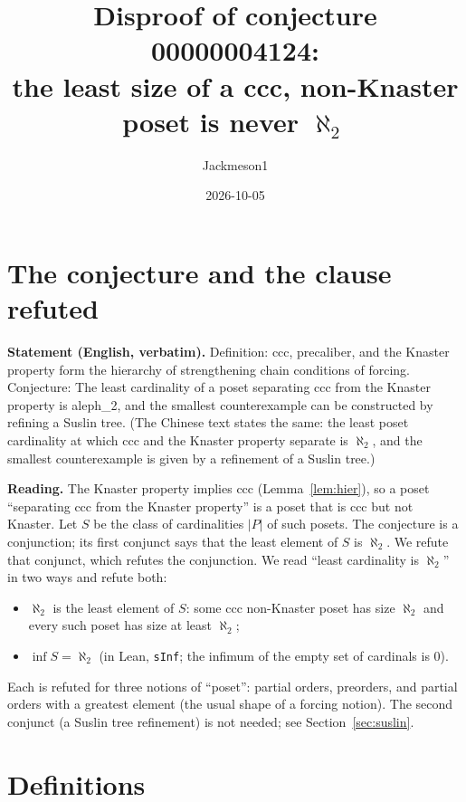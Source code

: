 \documentclass[11pt]{article}
\title{Disproof of conjecture 00000004124:\\ the least size of a ccc, non-Knaster poset is never $\aleph_2$}
\author{Jackmeson1}
\date{2026-10-05}
\theoremstyle{definition}
\begin{document}
\maketitle

\section{The conjecture and the clause refuted}

\textbf{Statement (English, verbatim).} Definition: ccc, precaliber, and the Knaster property form
the hierarchy of strengthening chain conditions of forcing. Conjecture: The least cardinality of a
poset separating ccc from the Knaster property is aleph\_2, and the smallest counterexample can be
constructed by refining a Suslin tree. (The Chinese text states the same: the least poset
cardinality at which ccc and the Knaster property separate is $\aleph_2$, and the smallest
counterexample is given by a refinement of a Suslin tree.)

\textbf{Reading.} The Knaster property implies ccc (Lemma~\ref{lem:hier}), so a poset
``separating ccc from the Knaster property'' is a poset that is ccc but not Knaster. Let
$S$ be the class of cardinalities $|P|$ of such posets. The conjecture is a conjunction; its
first conjunct says that the least element of $S$ is $\aleph_2$. We refute that conjunct, which
refutes the conjunction. We read ``least cardinality is $\aleph_2$'' in two ways and refute both:
\begin{itemize}
\item[(L1)] $\aleph_2$ is the least element of $S$: some ccc non-Knaster poset has size $\aleph_2$
  and every such poset has size at least $\aleph_2$;
\item[(L2)] $\inf S = \aleph_2$ (in Lean, \texttt{sInf}; the infimum of the empty set of cardinals
  is $0$).
\end{itemize}
Each is refuted for three notions of ``poset'': partial orders, preorders, and partial orders with a
greatest element (the usual shape of a forcing notion). The second conjunct (a Suslin tree
refinement) is not needed; see Section~\ref{sec:suslin}.

\section{Definitions}
\end{document}

